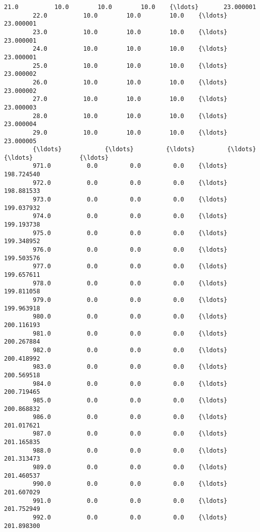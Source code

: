 \documentclass[11pt]{article}
\begin{document}
\begin{Verbatim}[commandchars=\\\{\}]
        21.0          10.0        10.0        10.0    {\ldots}       23.000001   
        22.0          10.0        10.0        10.0    {\ldots}       23.000001   
        23.0          10.0        10.0        10.0    {\ldots}       23.000001   
        24.0          10.0        10.0        10.0    {\ldots}       23.000001   
        25.0          10.0        10.0        10.0    {\ldots}       23.000002   
        26.0          10.0        10.0        10.0    {\ldots}       23.000002   
        27.0          10.0        10.0        10.0    {\ldots}       23.000003   
        28.0          10.0        10.0        10.0    {\ldots}       23.000004   
        29.0          10.0        10.0        10.0    {\ldots}       23.000005   
        {\ldots}            {\ldots}         {\ldots}         {\ldots}    {\ldots}             {\ldots}   
        971.0          0.0         0.0         0.0    {\ldots}      198.724540   
        972.0          0.0         0.0         0.0    {\ldots}      198.881533   
        973.0          0.0         0.0         0.0    {\ldots}      199.037932   
        974.0          0.0         0.0         0.0    {\ldots}      199.193738   
        975.0          0.0         0.0         0.0    {\ldots}      199.348952   
        976.0          0.0         0.0         0.0    {\ldots}      199.503576   
        977.0          0.0         0.0         0.0    {\ldots}      199.657611   
        978.0          0.0         0.0         0.0    {\ldots}      199.811058   
        979.0          0.0         0.0         0.0    {\ldots}      199.963918   
        980.0          0.0         0.0         0.0    {\ldots}      200.116193   
        981.0          0.0         0.0         0.0    {\ldots}      200.267884   
        982.0          0.0         0.0         0.0    {\ldots}      200.418992   
        983.0          0.0         0.0         0.0    {\ldots}      200.569518   
        984.0          0.0         0.0         0.0    {\ldots}      200.719465   
        985.0          0.0         0.0         0.0    {\ldots}      200.868832   
        986.0          0.0         0.0         0.0    {\ldots}      201.017621   
        987.0          0.0         0.0         0.0    {\ldots}      201.165835   
        988.0          0.0         0.0         0.0    {\ldots}      201.313473   
        989.0          0.0         0.0         0.0    {\ldots}      201.460537   
        990.0          0.0         0.0         0.0    {\ldots}      201.607029   
        991.0          0.0         0.0         0.0    {\ldots}      201.752949   
        992.0          0.0         0.0         0.0    {\ldots}      201.898300   

\end{Verbatim}
\end{document}
